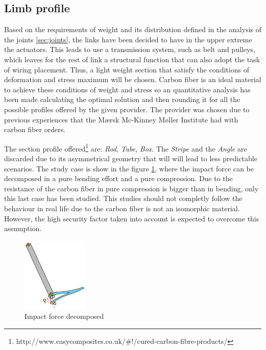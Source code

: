 \subsection{Limb profile} %
\label{sub:limb_profile}
Based on the requirements of weight and its distribution defined in the analysis of the joints \ref{sec:joints}, the links have been decided to have in the upper extreme the actuators. 
This leads to use a transmission system, such as belt and pulleys, which leaves for the rest of link a structural function that can also adopt the task of wiring placement.
Thus, a light weight section that satisfy the conditions of deformation and stress maximum will be chosen.
Carbon fiber is an ideal material to achieve these conditions of weight and stress so an quantitative analysis has been made calculating the optimal solution and then rounding it for all the possible profiles offered by the given provider.
The provider was chosen due to previous experiences that the Mærsk Mc-Kinney Møller Institute had with carbon fiber orders.

The section profile offered\footnote{http://www.easycomposites.co.uk/\#!/cured-carbon-fibre-products/} are: \textit{Rod}, \textit{Tube}, \textit{Box}. The \textit{Stripe} and the \textit{Angle} are discarded due to its asymmetrical geometry that will will lead to less predictable scenarios.
The study case is show in the figure \ref{fig:impact_decomposition}, where the impact force can be decomposed in a pure bending effort and a pure compression.
Due to the resistance of the carbon fiber in pure compression is bigger than in bending, only this last case has been studied.
This studies should not completly follow the behaviour in real life due to the carbon fiber is not an isomorphic material.
However, the high security factor taken into account is expected to overcome this assumption.

\begin{figure}[ht!]
  \centering
  \includegraphics[width=.3\textwidth]{figures/impact_decomposition.pdf}
  \caption{Impact force decomposed}
  \label{fig:impact_decomposition}
\end{figure}

